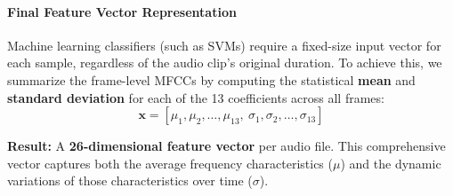 \paragraph{Final Feature Vector Representation}
Machine learning classifiers (such as SVMs) require a fixed-size input vector for each sample, regardless of the audio clip's original duration. To achieve this, we summarize the frame-level MFCCs by computing the statistical \textbf{mean} and \textbf{standard deviation} for each of the 13 coefficients across all frames:
\begin{equation}
    \mathbf{x} = [\mu_1, \mu_2, \ldots, \mu_{13},\ \sigma_1, \sigma_2, \ldots, \sigma_{13}]
\end{equation}

\noindent \textbf{Result:} A \textbf{26-dimensional feature vector} per audio file. This comprehensive vector captures both the average frequency characteristics ($\mu$) and the dynamic variations of those characteristics over time ($\sigma$).